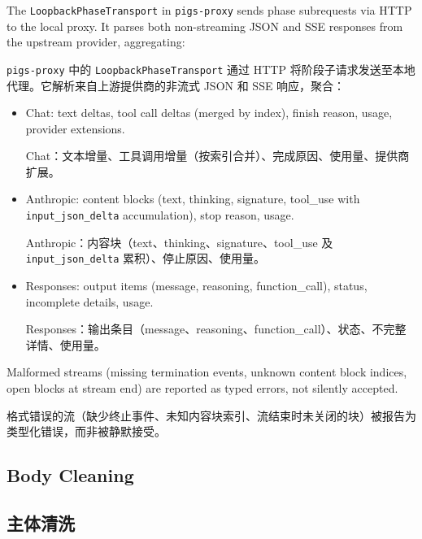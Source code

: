 The \texttt{LoopbackPhaseTransport} in \texttt{pigs-proxy} sends phase subrequests via HTTP to the local proxy. It parses both non-streaming JSON and SSE responses from the upstream provider, aggregating:
\begin{chinese}
\texttt{pigs-proxy} 中的 \texttt{LoopbackPhaseTransport} 通过 HTTP 将阶段子请求发送至本地代理。它解析来自上游提供商的非流式 JSON 和 SSE 响应，聚合：
\end{chinese}
\begin{itemize}[nosep]
    \item Chat: text deltas, tool call deltas (merged by index), finish reason, usage, provider extensions.
    \begin{chinese}
    Chat：文本增量、工具调用增量（按索引合并）、完成原因、使用量、提供商扩展。
    \end{chinese}
    \item Anthropic: content blocks (text, thinking, signature, tool\_use with \texttt{input\_json\_delta} accumulation), stop reason, usage.
    \begin{chinese}
    Anthropic：内容块（text、thinking、signature、tool\_use 及 \texttt{input\_json\_delta} 累积）、停止原因、使用量。
    \end{chinese}
    \item Responses: output items (message, reasoning, function\_call), status, incomplete details, usage.
    \begin{chinese}
    Responses：输出条目（message、reasoning、function\_call）、状态、不完整详情、使用量。
    \end{chinese}
\end{itemize}

Malformed streams (missing termination events, unknown content block indices, open blocks at stream end) are reported as typed errors, not silently accepted.
\begin{chinese}
格式错误的流（缺少终止事件、未知内容块索引、流结束时未关闭的块）被报告为类型化错误，而非被静默接受。
\end{chinese}

\subsection{Body Cleaning}
\begin{chinese}
\subsection{主体清洗}
\end{chinese}

